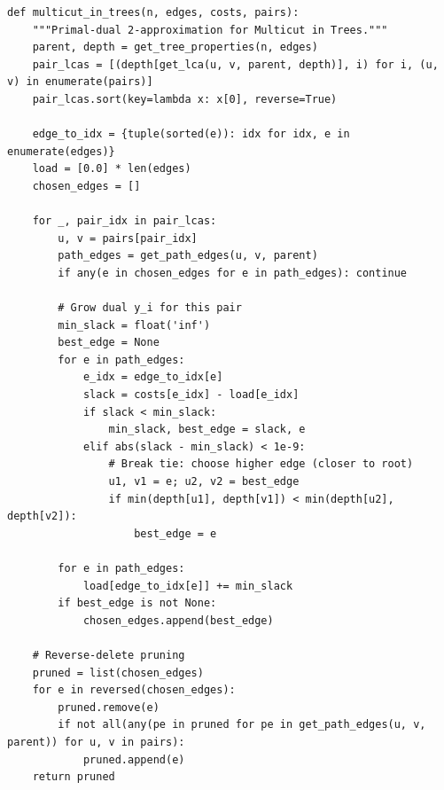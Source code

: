 \documentclass[11pt,oneside]{book}
\begin{document}
\begin{lstlisting}[style=python, caption=Primal-Dual Multicut in Trees]
def multicut_in_trees(n, edges, costs, pairs):
    """Primal-dual 2-approximation for Multicut in Trees."""
    parent, depth = get_tree_properties(n, edges)
    pair_lcas = [(depth[get_lca(u, v, parent, depth)], i) for i, (u, v) in enumerate(pairs)]
    pair_lcas.sort(key=lambda x: x[0], reverse=True)
    
    edge_to_idx = {tuple(sorted(e)): idx for idx, e in enumerate(edges)}
    load = [0.0] * len(edges)
    chosen_edges = []
    
    for _, pair_idx in pair_lcas:
        u, v = pairs[pair_idx]
        path_edges = get_path_edges(u, v, parent)
        if any(e in chosen_edges for e in path_edges): continue
        
        # Grow dual y_i for this pair
        min_slack = float('inf')
        best_edge = None
        for e in path_edges:
            e_idx = edge_to_idx[e]
            slack = costs[e_idx] - load[e_idx]
            if slack < min_slack:
                min_slack, best_edge = slack, e
            elif abs(slack - min_slack) < 1e-9:
                # Break tie: choose higher edge (closer to root)
                u1, v1 = e; u2, v2 = best_edge
                if min(depth[u1], depth[v1]) < min(depth[u2], depth[v2]):
                    best_edge = e
                    
        for e in path_edges:
            load[edge_to_idx[e]] += min_slack
        if best_edge is not None:
            chosen_edges.append(best_edge)
            
    # Reverse-delete pruning
    pruned = list(chosen_edges)
    for e in reversed(chosen_edges):
        pruned.remove(e)
        if not all(any(pe in pruned for pe in get_path_edges(u, v, parent)) for u, v in pairs):
            pruned.append(e)
    return pruned
\end{lstlisting}
\end{document}
